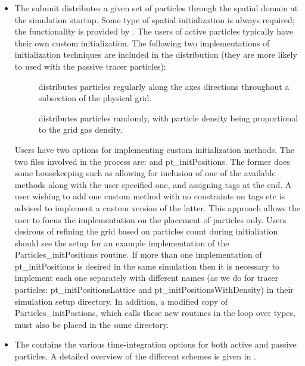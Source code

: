 \begin{itemize}

 \item The  subunit distributes a given
set of particles through the spatial domain at the simulation startup. Some
type of spatial initialization is always required; the functionality
is provided by . The users of active
particles typically have their own custom initialization. The
following two implementations of initialization techniques are
included in the \flashx distribution (they are more likely to
used with the passive tracer particles): 

      \begin{description}
      \item[] distributes particles regularly along the
	axes directions throughout a subsection of the physical grid.
      \item[] distributes particles randomly, with
	particle density being proportional to the grid gas density.
      \end{description}

Users have two options for implementing custom initialization
methods. The two files involved in the process are:
 and pt\_initPositions. The
former does some housekeeping such as allowing for inclusion
of one of the available methods along with the user specified one, and
assigning tags at the end. A user wishing to add one custom method
with no constraints on tags etc is advised to implement a custom
version of the latter. This approach allows the user to focus the
implementation on the placement of particles only. Users desirous of
refining the grid based on particles count during initialiation should
see the setup  for an example implementation of
the Particles\_initPositions routine. If more than one implementation
of pt\_initPositions is desired in the same simulation then it is
necessary to implement each one separately with different names (as we
do for tracer particles: pt\_initPositionsLattice and
pt\_initPositionsWithDensity) in their simulation setup directory. In
addition, a modified copy of Particles\_initPostions, which calls
these new routines in the loop over types, must also be
placed in the same directory.

\item The  \subunit contains the various
  time-integration options for both active and passive particles.  A 
  detailed overview of the different schemes is given in
  . 



\end{itemize}
